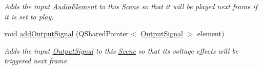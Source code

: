 \begin{DoxyCompactItemize}
\begin{DoxyCompactList}\small\item\em Adds the input \hyperlink{class_picto_1_1_audio_element}{Audio\-Element} to this \hyperlink{class_picto_1_1_scene}{Scene} so that it will be played next frame if it is set to play. \end{DoxyCompactList}\item 
\hypertarget{class_picto_1_1_scene_aa08595cf0763b8969bfef393bb6447f0}{void \hyperlink{class_picto_1_1_scene_aa08595cf0763b8969bfef393bb6447f0}{add\-Output\-Signal} (Q\-Shared\-Pointer$<$ \hyperlink{struct_picto_1_1_output_signal}{Output\-Signal} $>$ element)}\label{class_picto_1_1_scene_aa08595cf0763b8969bfef393bb6447f0}

\begin{DoxyCompactList}\small\item\em Adds the input \hyperlink{struct_picto_1_1_output_signal}{Output\-Signal} to this \hyperlink{class_picto_1_1_scene}{Scene} so that its voltage effects will be triggered next frame. \end{DoxyCompactList}\end{DoxyCompactItemize}
